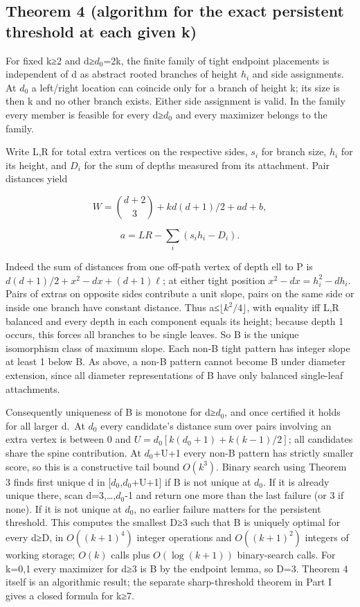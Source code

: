 \documentclass[
  10pt,
  a4paper,
]{article}
\begin{document}
\subsection{Theorem 4 (algorithm for the exact persistent threshold at
each given
k)}\label{theorem-4-algorithm-for-the-exact-persistent-threshold-at-each-given-k}

For fixed k≥2 and d≥\(d_0\)=2k, the finite family of tight endpoint
placements is independent of d as abstract rooted branches of height
\(h_i\) and side assignments. At \(d_0\) a left/right location can
coincide only for a branch of height k; its size is then k and no other
branch exists. Either side assignment is valid. In the family every
member is feasible for every d≥\(d_0\) and every maximizer belongs to
the family.

Write L,R for total extra vertices on the respective sides, \(s_i\) for
branch size, \(h_i\) for its height, and \(D_i\) for the sum of depths
measured from its attachment. Pair distances yield

\[W=\binom{d+2}{3}+kd(d+1)/2+ad+b,\]

\[a=LR-\sum_i(s_i h_i-D_i).\]

Indeed the sum of distances from one off-path vertex of depth ell to P
is \(d(d+1)/2+x^2-dx+(d+1)\ell\); at either tight position
\(x^2-dx=h_i^2-dh_i\). Pairs of extras on opposite sides contribute a
unit slope, pairs on the same side or inside one branch have constant
distance. Thus a≤\(\lfloor k^2/4\rfloor\), with equality iff L,R
balanced and every depth in each component equals its height; because
depth 1 occurs, this forces all branches to be single leaves. So B is
the unique isomorphism class of maximum slope. Each non-B tight pattern
has integer slope at least 1 below B. As above, a non-B pattern cannot
become B under diameter extension, since all diameter representations of
B have only balanced single-leaf attachments.

Consequently uniqueness of B is monotone for d≥\(d_0\), and once
certified it holds for all larger d.~At \(d_0\) every candidate's
distance sum over pairs involving an extra vertex is between 0 and
\(U=d_0[k(d_0+1)+k(k-1)/2]\); all candidates share the spine
contribution. At \(d_0\)+U+1 every non-B pattern has strictly smaller
score, so this is a constructive tail bound \(O(k^3)\). Binary search
using Theorem 3 finds first unique d in {[}\(d_0\),\(d_0\)+U+1{]} if B
is not unique at \(d_0\). If it is already unique there, scan
d=3,\ldots,\(d_0\)-1 and return one more than the last failure (or 3 if
none). If it is not unique at \(d_0\), no earlier failure matters for
the persistent threshold. This computes the smallest D≥3 such that B is
uniquely optimal for every d≥D, in \(O((k+1)^4)\) integer operations and
\(O((k+1)^2)\) integers of working storage; \(O(k)\) calls plus
\(O(\log(k+1))\) binary-search calls. For k=0,1 every maximizer for d≥3
is B by the endpoint lemma, so D=3. Theorem 4 itself is an algorithmic
result; the separate sharp-threshold theorem in Part I gives a closed
formula for k≥7.
\end{document}
